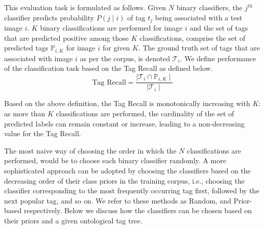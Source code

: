 \indent This evaluation task is formulated as follows. Given $N$ binary classifiers, the $j^{th}$ classifier predicts probability $P(j \mid i)$ of tag $t_j$ being associated with a test image $i$. $K$ binary classifications are performed for image $i$ and the set of tags that are predicted positive among those $K$ classifications, comprise the set of predicted tags $\mathbb{P}_{i,K}$ for image $i$ for given $K$. The ground truth set of tags that are associated with image $i$ as per the corpus, is denoted $\mathcal{T}_{i}$. We define performance of the classification task based on the Tag Recall as defined below.
\begin{equation} 
\text{Tag Recall} = \frac{\mid \mathcal{T}_i \cap \mathbb{P}_{i,K} \mid}{ \mid \mathcal{T}_i \mid} 
\label{eq:TagClassfnRecall}
\end{equation} 

Based on the above definition, the Tag Recall is monotonically increasing with $K$: as more than $K$ classifications are performed, the cardinality of the set of predicted labels can remain constant or increase, leading to a non-decreasing value for the Tag Recall. 

\indent The most naive way of choosing the order in which the $N$ classifications are performed, would be to choose each binary classifier randomly. A more sophisticated approach can be adopted by choosing the classifiers based on the decreasing order of their class priors in the training corpus, i.e., choosing the classifier corresponding to the most frequently occurring tag first, followed by the next popular tag, and so on. We refer to these methods as Random, and Prior-based respectively. Below we discuss how the classifiers can be chosen based on their priors and a given ontological tag tree. 

